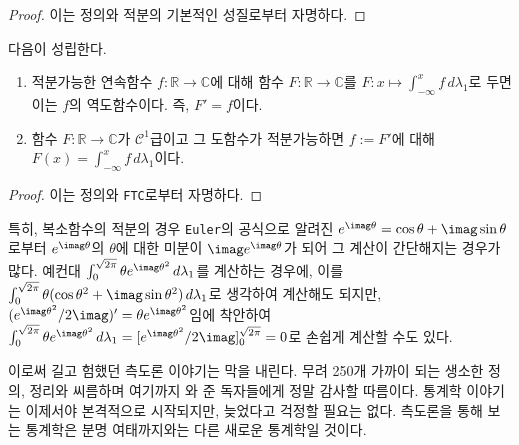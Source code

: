 \begin{proof}
    이는 정의와 적분의 기본적인 성질로부터 자명하다.
\end{proof}

\begin{corollary}
    다음이 성립한다.
    \begin{enumerate}
        \item 적분가능한 연속함수 $f:\mathbb{R}\to\mathbb{C}$에 대해 함수 $F:\mathbb{R}\to\mathbb{C}$를 $F:x\mapsto\int_{-\infty}^xf\,d\lambda_1$로 두면 이는 $f$의 역도함수이다. 즉, $F'=f$이다.
        \item 함수 $F:\mathbb{R}\to\mathbb{C}$가 $\mathcal{C}^1$급이고 그 도함수가 적분가능하면 $f:=F'$에 대해 $F(x)=\int_{-\infty}^xf\,d\lambda_1$이다.
    \end{enumerate}
\end{corollary}

\begin{proof}
    이는 정의와 \texttt{FTC}로부터 자명하다.
\end{proof}

특히, 복소함수의 적분의 경우 \texttt{Euler}의 공식으로 알려진 $e^{\imag\theta}=\cos\theta+\imag\sin\theta$로부터 $e^{\imag\theta}$의 $\theta$에 대한 미분이 $\imag e^{\imag\theta}$가 되어 그 계산이 간단해지는 경우가 많다. 예컨대 $\int_0^{\sqrt{2\pi}}\theta e^{\imag\theta^2}\,d\lambda_1$를 계산하는 경우에, 이를 $\int_0^{\sqrt{2\pi}}\theta(\cos\theta^2+\imag\sin\theta^2)\,d\lambda_1$로 생각하여 계산해도 되지만, $(e^{\imag\theta^2}/2\imag)'=\theta e^{\imag\theta^2}$임에 착안하여 $\int_0^{\sqrt{2\pi}}\theta e^{\imag\theta^2}\,d\lambda_1=[e^{\imag\theta^2}/2\imag]_0^{\sqrt{2\pi}}=0$로 손쉽게 계산할 수도 있다.

이로써 길고 험했던 측도론 이야기는 막을 내린다. 무려 250개 가까이 되는 생소한 정의, 정리와 씨름하며 여기까지 와 준 독자들에게 정말 감사할 따름이다. 통계학 이야기는 이제서야 본격적으로 시작되지만, 늦었다고 걱정할 필요는 없다. 측도론을 통해 보는 통계학은 분명 여태까지와는 다른 새로운 통계학일 것이다.


